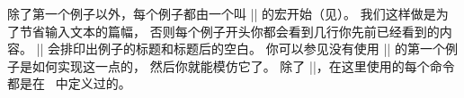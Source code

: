 除了第一个例子以外，每个例子都由一个叫 |\xmpheader| 的宏开始（见）。
我们这样做是为了节省输入文本的篇幅，
否则每个例子开头你都会看到几行你先前已经看到的内容。
|\xmpheader| 会排印出例子的标题和标题后的空白。
你可以参见没有使用 |\xmpheader| 的第一个例子是如何实现这一点的，
然后你就能模仿它了。
除了 |\xmpheader|，在这里使用的每个命令都是在 \PlainTeX\ 中定义过的。

{%
   \let\bye = \relax %
}%

\ifoldeplain\else\ifcompletebook\else
\vfil{}
\fi\fi

\endchapter
\byebye

